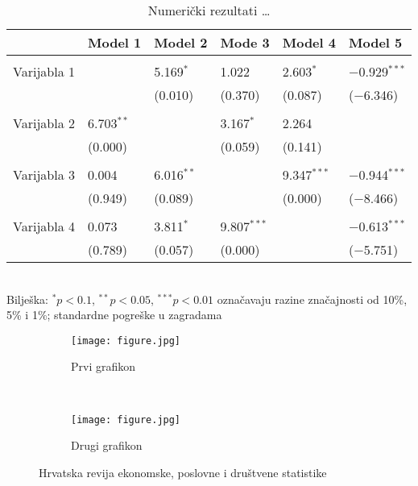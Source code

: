 \documentclass[
  letterpaper,
  DIV=11,
  numbers=noendperiod]{scrartcl}
\begin{document}
	\medskip
	\begin{table}[H]
	\centering
	\caption{Numerički rezultati \dots}
	\label{tab:tab1}
	\small	
	\begin{tabular}{l|lllll} \toprule
		& Model 1   & Model 2  & Mode 3  & Model 4  & Model 5 \\ \hline \hline
		&&&&& \\ [-1em]  
		Varijabla 1 &       & 5.169$^{*}$ & 1.022 & 2.603$^{*}$ & $-$0.929$^{***}$  \\
		&       & (0.010)    & (0.370)    & (0.087)    & ($-$6.346)    \\ &&&&& \\ [-1em] 
	Varijabla 2  & 6.703$^{**}$ &       & 3.167$^{*}$ & 2.264 &         \\
		& (0.000)   &       & (0.059)  & (0.141)    &         \\ &&&&& \\ [-1em] 
		Varijabla 3 & 0.004 & 6.016$^{**}$ &       & 9.347$^{***}$ & $-$0.944$^{***}$  \\
		&    (0.949)   &   (0.089)    &       & (0.000)  &  ($-$8.466)      \\ &&&&& \\ [-1em] 
		Varijabla 4 & 0.073 & 3.811$^{*}$ & 9.807$^{***}$ &       & $-$0.613$^{***}$  \\
		& (0.789)    & (0.057)    & (0.000)    &       &  ($-$5.751)     \\ \bottomrule
	\end{tabular} \\
	\vspace{1ex} \footnotesize {Bilješka: $^{*} p < 0.1$, $^{**} p < 0.05$, $^{***} p < 0.01$ označavaju razine značajnosti od 10\%, 5\% i 1\%; standardne pogreške u zagradama}
\end{table}

	\begin{figure}[H] 
		\centering
		\begin{subfigure}{0.25\textwidth}
			\texttt{[image: figure.jpg]}
			\caption{Prvi grafikon}
		\end{subfigure}~~~~\begin{subfigure}{0.25\textwidth}
			\texttt{[image: figure.jpg]}
			\caption{Drugi grafikon}
		\end{subfigure}
	\caption{Hrvatska revija ekonomske, poslovne i društvene statistike}
	\label{fig:fig2}
	\end{figure} 


\end{document}
